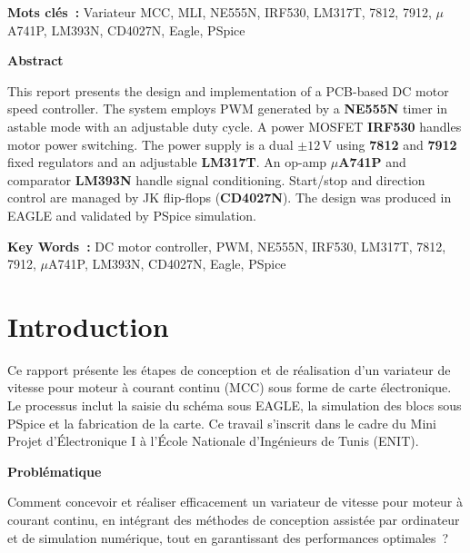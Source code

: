 \documentclass[a4paper,12pt,openany]{book}
\begin{document}
	\noindent \textbf{Mots cl\'es~:} Variateur MCC, MLI, NE555N, IRF530,
	LM317T, 7812, 7912, $\mu$A741P, LM393N, CD4027N, Eagle, PSpice
	
	\vspace{2\baselineskip}
	\centerline{\Large \textbf{Abstract}}
	\vspace{\baselineskip}
	
	This report presents the design and implementation of a PCB-based DC motor
	speed controller. The system employs PWM generated by a \textbf{NE555N}
	timer in astable mode with an adjustable duty cycle. A power MOSFET
	\textbf{IRF530} handles motor power switching. The power supply is a dual
	$\pm12$\,V using \textbf{7812} and \textbf{7912} fixed regulators and an
	adjustable \textbf{LM317T}. An op-amp \textbf{$\mu$A741P} and comparator
	\textbf{LM393N} handle signal conditioning. Start/stop and direction control
	are managed by JK flip-flops (\textbf{CD4027N}). The design was produced in
	EAGLE and validated by PSpice simulation.
	
	\noindent \textbf{Key Words~:} DC motor controller, PWM, NE555N, IRF530,
	LM317T, 7812, 7912, $\mu$A741P, LM393N, CD4027N, Eagle, PSpice
	
	\tableofcontents
	\newpage
	\listoffigures
	\newpage
	\listoftables
	
	\chapter*{Introduction}
	
	Ce rapport pr\'esente les \'etapes de conception et de r\'ealisation d'un
	variateur de vitesse pour moteur \`a courant continu (MCC) sous forme de
	carte \'electronique. Le processus inclut la saisie du sch\'ema sous EAGLE,
	la simulation des blocs sous PSpice et la fabrication de la carte. Ce
	travail s'inscrit dans le cadre du Mini Projet d'\'Electronique I \`a
	l'\'Ecole Nationale d'Ing\'enieurs de Tunis (ENIT).
	
	\bigskip\noindent\textbf{Probl\'ematique}
	
	Comment concevoir et r\'ealiser efficacement un variateur de vitesse pour
	moteur \`a courant continu, en int\'egrant des m\'ethodes de conception
	assist\'ee par ordinateur et de simulation num\'erique, tout en garantissant
	des performances optimales~?
	
\end{document}
